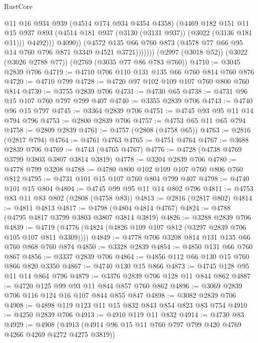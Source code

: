 \begin{lexlean}{RustCore}
\begin{coremodule}
                      @11
                      @16
                      @934
                      @939
                      (@4514 @174 @934 @4354 @4358)
                      (@4469
                        @182
                        @151
                        @11
                        @15
                        @937
                        @893
                        (@4514 @181 @937 (@3130 (@3131 @937)) (@3022 (@3136 @181 @11)))
                        @4492)))
                  @4090))
              (@4572
                @135
                @66
                @760
                @873
                (@4578 @77 @66 @95 @14 @760 @796 @871 @3349 @4521 @3721)))))))
    (@2997 (@3018 @52))
    (@3022 (@3026 @2788 @77))
    (@2769 (@3035 @77 @86 @783 @760))
@4710 := @3045 @2839 @706
@4719 := @4710 @706 @110 @131 @135 @66 @760 @814 @760 @876
@4720 := @4710 @799
@4728 := @4720 @97 @102 @109 @107 @760 @800 @760 @814
@4730 := @3755 @2839 @706
@4731 := @4730 @65
@4738 := @4731 @96 @15 @107 @760 @797 @799 @407
@4740 := @3355 @2839 @706
@4743 := @4740 @96 @15 @797
@4745 := @3364 @2839 @706
@4751 := @4745 @93 @95 @11 @14 @794 @796
@4753 := @2800 @2839 @706
@4757 := @4753 @65 @11 @65 @794
@4758 := @2809 @2839
@4761 := @4757 (@2808 (@4758 @65))
@4763 := @2816 (@2817 @794)
@4764 := @4761 @4763
@4765 := @4751 @4764
@4767 := @3688 @2839 @706
@4769 := @4743 (@4765 @4767)
@4776 := @4728 (@4738 @4769 @3799 @3803 @3807 @3814 @3819)
@4778 := @3204 @2839 @706
@4780 := @4778 @799 @3208
@4788 := @4780 @800 @102 @109 @107 @760 @806 @760 @812
@4795 := @4731 @101 @15 @107 @760 @804 @799 @407
@4798 := @4740 @101 @15 @804
@4804 := @4745 @99 @95 @11 @14 @802 @796
@4811 := @4753 @83 @11 @83 @802 (@2808 (@4758 @83))
@4813 := @2816 (@2817 @802)
@4814 := @4811 @4813
@4817 := @4798 (@4804 @4814 @4767)
@4824 := @4788 (@4795 @4817 @3799 @3803 @3807 @3814 @3819)
@4826 := @3288 @2839 @706
@4839 := @4719 (@4776 (@4824 (@4826 @109 @107 @812 (@3297 @2839 @706 @105 @107 @811 @3309))))
@4849 := @4778 @706 @3208 @814 @131 @135 @66 @760 @868 @760 @874
@4850 := @3328 @2839
@4854 := @4850 @131 @66 @760 @867
@4856 := @3337 @2839 @706
@4864 := @4856 @112 @66 @130 @15 @760 @866 @820 @3350
@4867 := @4740 @130 @15 @866
@4873 := @4745 @128 @95 @11 @14 @864 @796
@4879 := @3376 @2839 @706 @128 @11 @844 @862
@4887 := @4720 @125 @99 @93 @11 @844 @857 @760 @862
@4896 := @3069 @2839 @706 @116 @124 @16 @107 @844 @855 @847
@4898 := @3082 @2839 @706
@4908 := @4898 @119 @123 @11 @15 @832 @843 @854 @823 @83 @754
@4910 := @4250 @2839 @706
@4913 := @4910 @119 @11 @832
@4914 := @4730 @83
@4929 := @4908 (@4913 (@4914 @96 @15 @11 @760 @797 @799 @420 @4769 @4266 @4269 @4272 @4275 @3819))

\end{coremodule}
\end{lexlean}
